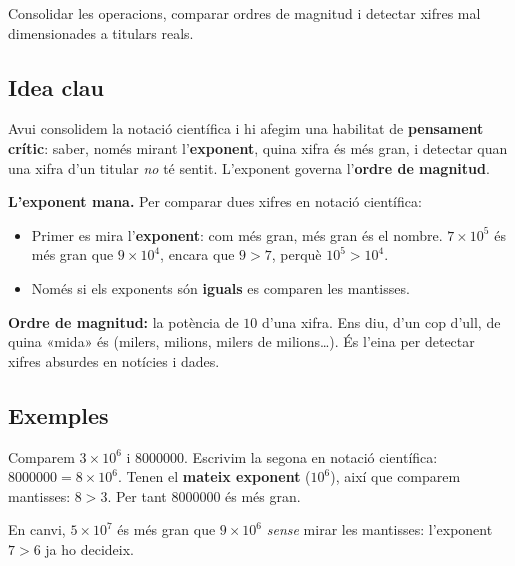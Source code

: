 %
{Consolidar les operacions, comparar ordres de magnitud i detectar xifres mal dimensionades a titulars reals.}

\subsection{Idea clau}

Avui consolidem la notació científica i hi afegim una habilitat de \textbf{pensament
crític}: saber, només mirant l'\textbf{exponent}, quina xifra és més gran, i detectar
quan una xifra d'un titular \emph{no} té sentit. L'exponent governa l'\textbf{ordre
de magnitud}.

\begin{idea}
\textbf{L'exponent mana.} Per comparar dues xifres en notació científica:
\begin{itemize}[leftmargin=1.4em, itemsep=2pt]
  \item Primer es mira l'\textbf{exponent}: com més gran, més gran és el nombre.
        $7\times 10^{5}$ és més gran que $9\times 10^{4}$, encara que $9>7$, perquè
        $10^{5}>10^{4}$.
  \item Només si els exponents són \textbf{iguals} es comparen les mantisses.
\end{itemize}
\textbf{Ordre de magnitud:} la potència de $10$ d'una xifra. Ens diu, d'un cop d'ull,
de quina «mida» és (milers, milions, milers de milions\dots). És l'eina per detectar
xifres absurdes en notícies i dades.
\end{idea}

\subsection{Exemples}

\begin{exemple}
Comparem $3\times 10^{6}$ i $\num{8000000}$. Escrivim la segona en notació
científica: $\num{8000000}=8\times 10^{6}$. Tenen el \textbf{mateix exponent}
($10^{6}$), així que comparem mantisses: $8>3$. Per tant $\num{8000000}$ és més gran.

En canvi, $5\times 10^{7}$ és més gran que $9\times 10^{6}$ \emph{sense} mirar les
mantisses: l'exponent $7>6$ ja ho decideix.
\end{exemple}


